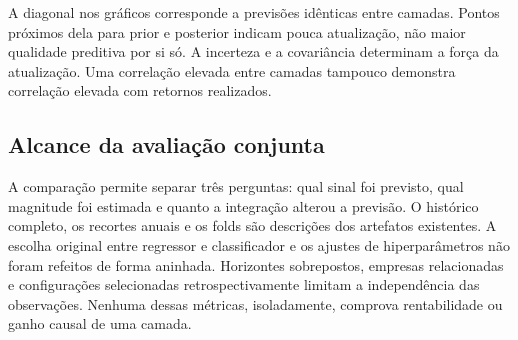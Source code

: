 A diagonal nos gráficos corresponde a previsões idênticas entre camadas. Pontos próximos dela para prior e posterior indicam pouca atualização, não maior qualidade preditiva por si só. A incerteza e a covariância determinam a força da atualização. Uma correlação elevada entre camadas tampouco demonstra correlação elevada com retornos realizados.

\subsection{Alcance da avaliação conjunta}

A comparação permite separar três perguntas: qual sinal foi previsto, qual magnitude foi estimada e quanto a integração alterou a previsão. O histórico completo, os recortes anuais e os folds são descrições dos artefatos existentes. A escolha original entre regressor e classificador e os ajustes de hiperparâmetros não foram refeitos de forma aninhada. Horizontes sobrepostos, empresas relacionadas e configurações selecionadas retrospectivamente limitam a independência das observações. Nenhuma dessas métricas, isoladamente, comprova rentabilidade ou ganho causal de uma camada.
